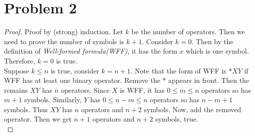 \section*{Problem 2}
	\begin{proof}
		Proof by (strong) induction. Let $k$ be the number of operators. Then we need to prove the number of symbols is $k + 1$. Consider $k=0$. Then by the definition of \textit{Well-formed formula(WFF)}, it has the form $x$ which is one symbol. Therefore, $k=0$ is true.\\
		Suppose $k \leq n$ is true, consider $k=n+1$. Note that the form of WFF is $*XY$ if WFF has at least one binary operator. Remove the $*$ appears in front. Then the remains $XY$ has $n$ operators. Since $X$ is WFF, it has $0 \leq m\leq n$ operators so has $m + 1$ symbols. Similarly, $Y$ has $0\leq n - m \leq n$ operators so has $n - m + 1$ symbols. Thus $XY$ has $n$ operators and $n + 2$ symbols. Now, add the removed operator. Then we get $n+1$ operators and $n+2$ symbols, true.\\
	\end{proof}